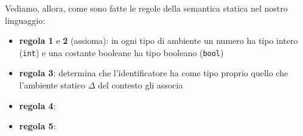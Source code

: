 Vediamo, allora, come sono fatte le regole della semantica statica nel nostro linguaggio:
\begin{itemize}[label=$\triangleright$, itemsep=\medskipamount]
    \item \textbf{regola 1} e \textbf{2} (assioma): in ogni tipo di ambiente un numero ha tipo intero (\texttt{int}) e una costante booleane ha tipo booleano (\texttt{bool})
    
    \begin{minipage}[t]{0.45\textwidth}
    \end{minipage}
    \hfill
    \begin{minipage}[t]{0.45\textwidth}
    \end{minipage}
    \item \textbf{regola 3}: determina che l'identificatore ha come tipo proprio quello che l'ambiente statico $\Delta$ del contesto gli associa
    \item \textbf{regola 4}:
    \item \textbf{regola 5}:
\end{itemize}
